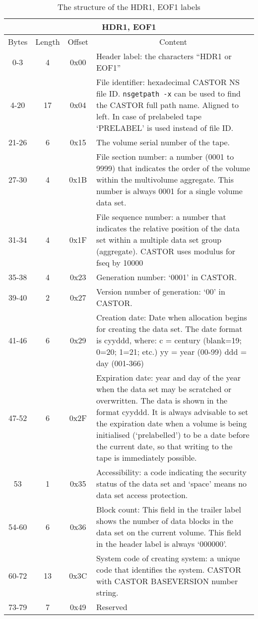 \begin{table}[ht]
\caption{The structure of the HDR1, EOF1 labels}
\label{tab:hdr1_eof1_labels}
\begin{center}
\begin{tabularx}{\textwidth}{ |c|c|c|X| }
  \hline
  \multicolumn{4}{|c|}{HDR1, EOF1} \\
  \hline
  Bytes & Length & Offset & \multicolumn{1}{c|}{Content} \\
  \hline \hline
  0-3 & 4 & 0x00 & Header label: the characters ``HDR1 or EOF1'' \\
  \hline
  4-20 & 17 & 0x04 & File identifier: hexadecimal CASTOR NS file ID. 
  \texttt{nsgetpath -x} can be used to find the CASTOR full path name. Aligned to left.
  In case of prelabeled tape `PRELABEL' is used instead of file ID.\\
  \hline
  21-26 & 6 & 0x15 & The volume serial number of the tape.\\
  \hline
  27-30 & 4 & 0x1B & File section number:  a number (0001 to 9999) that indicates
  the order of the volume within the multivolume aggregate.
  This number is always 0001 for a single volume data set. \\
  \hline
  31-34 & 4 & 0x1F & File sequence number: a number that indicates
  the relative position of the data set within a multiple data set group (aggregate).
  CASTOR uses modulus for fseq by 10000 \\
  \hline
  35-38 & 4 & 0x23 & Generation number:  `0001' in CASTOR. \\
  \hline
  39-40 & 2 & 0x27 & Version number of generation: `00' in CASTOR. 
   \\
  \hline
  41-46 & 6 & 0x29 & Creation date:  Date when allocation begins for creating the
   data set. The date format is  cyyddd, where:
   c = century (blank=19; 0=20; 1=21; etc.)
   yy = year (00-99)
  ddd = day (001-366) \\
  \hline
  47-52 & 6 & 0x2F & Expiration date: year and day of the year when the data set may be 
  scratched or overwritten. The data is shown in the format cyyddd.
  It is always advisable to set the expiration date when a volume is being initialised 
  (`prelabelled') to be a date before the current date, so that writing to the tape 
  is immediately possible.  \\
  \hline
  53 & 1 & 0x35 & Accessibility: a code indicating the security status of the data set and
  `space' means no data set access protection.  \\
  \hline
  54-60 & 6 & 0x36 & Block count: This field in the trailer label shows the number of data
  blocks in the data set on the current volume. This field in the header label is always `000000'. \\
  \hline
  60-72 & 13 & 0x3C & System code of creating system: a unique code that identifies the system.
  CASTOR with CASTOR BASEVERSION number string. \\
  \hline
  73-79 & 7 & 0x49 & Reserved \\
  \hline
\end{tabularx}
\end{center}
\end{table}

